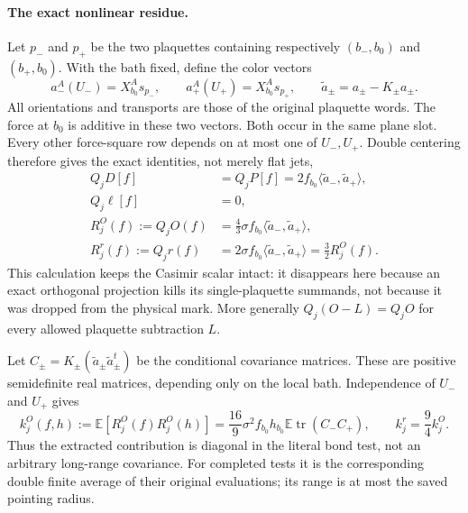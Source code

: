\documentclass[11pt]{article}
\newcommand{\E}{\mathbb E}
\begin{document}
\paragraph{The exact nonlinear residue.}
Let $p_-$ and $p_+$ be the two plaquettes containing respectively $(b_-,b_0)$ and
$(b_+,b_0)$. With the bath fixed, define the color vectors
\[
 a_-^A(U_-)=X_{b_0}^A s_{p_-},\qquad
 a_+^A(U_+)=X_{b_0}^A s_{p_+},\qquad
 \widetilde a_\pm=a_\pm-K_\pm a_\pm .
\]
All orientations and transports are those of the original plaquette words.
The force at $b_0$ is additive in these two vectors. Both occur in the same plane slot.
Every other force-square row depends on at most one of $U_-,U_+$.
Double centering therefore gives the exact identities, not merely flat jets,
\begin{align}
 Q_jD[f]&=Q_jP[f]=2f_{b_0}\langle\widetilde a_-,\widetilde a_+\rangle,\\
 Q_j\ell[f]&=0,\\
 R_j^O(f):=Q_jO(f)&=\tfrac43\sigma f_{b_0}
                 \langle\widetilde a_-,\widetilde a_+\rangle,\label{resO}\\
 R_j^r(f):=Q_jr(f)&=2\sigma f_{b_0}
                 \langle\widetilde a_-,\widetilde a_+\rangle
                 =\tfrac32 R_j^O(f).\label{resr}
\end{align}
This calculation keeps the Casimir scalar intact: it disappears here because an exact
orthogonal projection kills its single-plaquette summands, not because it was dropped
from the physical mark. More generally $Q_j(O-L)=Q_jO$ for every allowed plaquette subtraction $L$.

Let $C_\pm=K_\pm(\widetilde a_\pm\widetilde a_\pm^t)$ be the conditional covariance
matrices. These are positive semidefinite real matrices, depending only on the local bath.
Independence of $U_-$ and $U_+$ gives
\begin{equation}\label{noise}
 k_j^O(f,h):=\E[R_j^O(f)R_j^O(h)]
 =\frac{16}{9}\sigma^2 f_{b_0}h_{b_0}\E\operatorname{tr}(C_-C_+),
 \qquad k_j^r=\frac94 k_j^O.
\end{equation}
Thus the extracted contribution is diagonal in the literal bond test, not an arbitrary
long-range covariance. For completed tests it is the corresponding double finite average
of their original evaluations; its range is at most the saved pointing radius.
\end{document}
